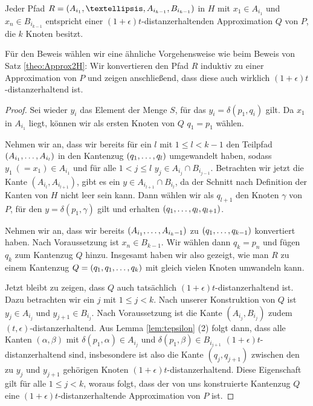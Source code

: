 	\begin{theorem}
		\label{theo:H2Approx}
		Jeder Pfad $R = (A_{i_1}, \textellipsis, A_{i_{k-1}}, B_{i_{k-1}})$ in $H$ mit $x_1 \in A_{i_1}$ und $x_n \in B_{i_{k-1}}$ entspricht einer $(1+\epsilon)t$-distanzerhaltenden Approximation $Q$ von $P$, die $k$ Knoten besitzt.
	\end{theorem}
	Für den Beweis wählen wir eine ähnliche Vorgehensweise wie beim Beweis von Satz \ref{theo:Approx2H}: Wir konvertieren den Pfad $R$ induktiv zu einer Approximation von $P$ und zeigen anschließend, dass diese auch wirklich $(1 + \epsilon)t$-distanzerhaltend ist.
	\begin{proof}
		Sei wieder $y_i$ das Element der Menge $S$, für das $y_i = \delta(p_1, q_i)$ gilt.
		Da $x_1$ in $A_{i_1}$ liegt, können wir als ersten Knoten von $Q$ $q_1 = p_1$ wählen.
		
		Nehmen wir an, dass wir bereits für ein $l$ mit $1 \leq l < k-1$ den Teilpfad $(A_{i_1}, \mathellipsis, A_{i_l})$ in den Kantenzug $(q_1, \mathellipsis, q_l)$ umgewandelt haben, sodass $y_1\ (= x_1) \in A_{i_1}$ und für alle $1 < j \leq l$ $y_j \in A_{i_j} \cap B_{i_{j-1}}$. 
		Betrachten wir jetzt die Kante $(A_{i_l}, A_{i_{l+1}})$, gibt es ein $y \in A_{i_{l+1}} \cap B_{i_l}$, da der Schnitt nach Definition der Kanten von $H$ nicht leer sein kann. 
		Dann wählen wir als $q_{l+1}$ den Knoten $\gamma$ von $P$, für den $y = \delta(p_1, \gamma)$ gilt und erhalten $(q_1, \mathellipsis, q_l, q_{l+1})$.
		
		Nehmen wir an, dass wir bereits $(A_{i_1}, \mathellipsis, A_{i_k-1})$ zu $(q_1, \mathellipsis, q_{k-1})$ konvertiert haben. Nach Voraussetzung ist $x_n \in B_{k-1}$. Wir wählen dann $q_k = p_n$ und fügen $q_k$ zum Kantenzug $Q$ hinzu. 
		Insgesamt haben wir also gezeigt, wie man $R$ zu einem Kantenzug $Q = (q_1, q_1, \mathellipsis, q_k)$ mit gleich vielen Knoten umwandeln kann. 
		
		Jetzt bleibt zu zeigen, dass $Q$ auch tatsächlich $(1+\epsilon)t$-distanzerhaltend ist.
		Dazu betrachten wir ein $j$ mit $1 \leq j < k$. 
		Nach unserer Konstruktion von $Q$ ist $y_j \in A_{i_j}$ und $y_{j+1} \in B_{i_j}$. 
		Nach Voraussetzung ist die Kante $(A_{i_j}, B_{i_j})$ zudem $(t, \epsilon)$-distanzerhaltend.
		Aus Lemma \ref{lem:tepsilon} (2) folgt dann, dass alle Kanten $(\alpha, \beta)$ mit $\delta(p_1, \alpha) \in A_{i_j}$ und $\delta(p_1, \beta) \in B_{i_{j+1}}$ $(1+\epsilon)t$-distanzerhaltend sind, insbesondere ist also die Kante $(q_j, q_{j+1})$ zwischen den zu $y_j$ und $y_{j+1}$ gehörigen Knoten $(1+\epsilon)t$-distanzerhaltend. 
		Diese Eigenschaft gilt für alle $1 \leq j < k$, woraus folgt, dass der von uns konstruierte Kantenzug $Q$ eine $(1+\epsilon)t$-distanzerhaltende Approximation von $P$ ist.
	\end{proof}
    
